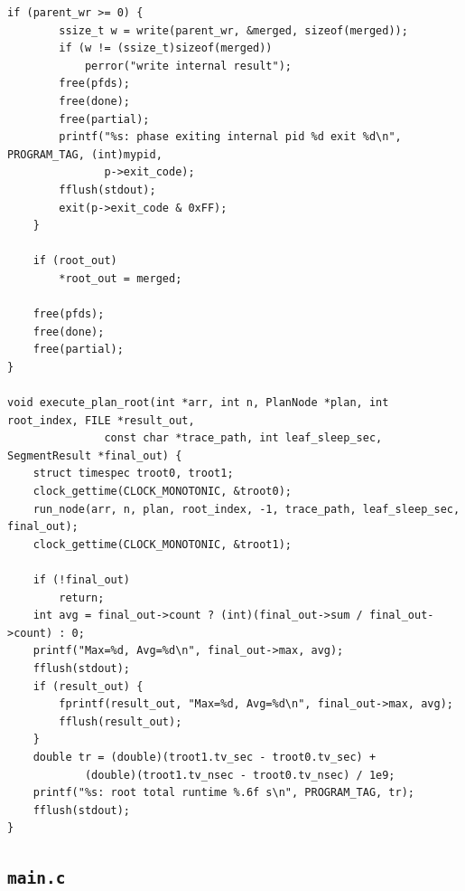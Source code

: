 \documentclass[11pt,a4paper]{article}
\begin{document}
\begin{lstlisting}[caption={File \texttt{tree\_proc.c}},label=lst:tree_proc_c]
	if (parent_wr >= 0) {
		ssize_t w = write(parent_wr, &merged, sizeof(merged));
		if (w != (ssize_t)sizeof(merged))
			perror("write internal result");
		free(pfds);
		free(done);
		free(partial);
		printf("%s: phase exiting internal pid %d exit %d\n", PROGRAM_TAG, (int)mypid,
		       p->exit_code);
		fflush(stdout);
		exit(p->exit_code & 0xFF);
	}

	if (root_out)
		*root_out = merged;

	free(pfds);
	free(done);
	free(partial);
}

void execute_plan_root(int *arr, int n, PlanNode *plan, int root_index, FILE *result_out,
		       const char *trace_path, int leaf_sleep_sec, SegmentResult *final_out) {
	struct timespec troot0, troot1;
	clock_gettime(CLOCK_MONOTONIC, &troot0);
	run_node(arr, n, plan, root_index, -1, trace_path, leaf_sleep_sec, final_out);
	clock_gettime(CLOCK_MONOTONIC, &troot1);

	if (!final_out)
		return;
	int avg = final_out->count ? (int)(final_out->sum / final_out->count) : 0;
	printf("Max=%d, Avg=%d\n", final_out->max, avg);
	fflush(stdout);
	if (result_out) {
		fprintf(result_out, "Max=%d, Avg=%d\n", final_out->max, avg);
		fflush(result_out);
	}
	double tr = (double)(troot1.tv_sec - troot0.tv_sec) +
		    (double)(troot1.tv_nsec - troot0.tv_nsec) / 1e9;
	printf("%s: root total runtime %.6f s\n", PROGRAM_TAG, tr);
	fflush(stdout);
}

\end{lstlisting}\clearpage

\subsection{\texttt{main.c}}
\end{document}
